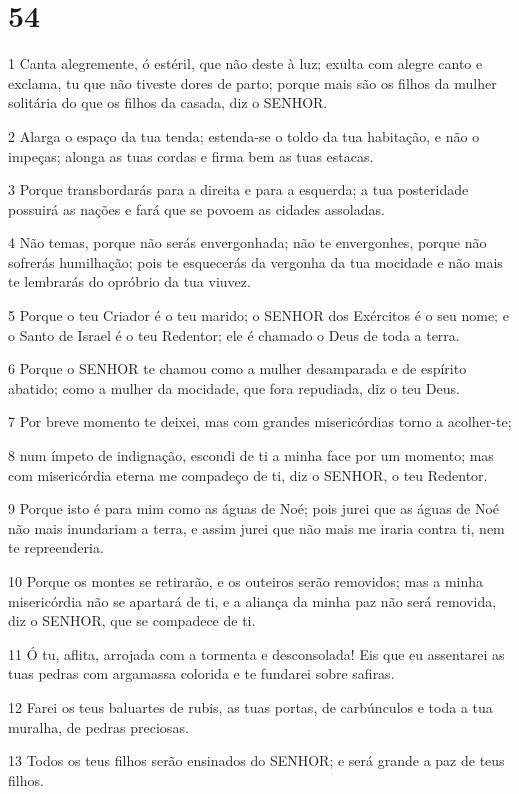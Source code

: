 \chapter{54}

\par 1 Canta alegremente, ó estéril, que não deste à luz; exulta com alegre canto e exclama, tu que não tiveste dores de parto; porque mais são os filhos da mulher solitária do que os filhos da casada, diz o SENHOR.
\par 2 Alarga o espaço da tua tenda; estenda-se o toldo da tua habitação, e não o impeças; alonga as tuas cordas e firma bem as tuas estacas.
\par 3 Porque transbordarás para a direita e para a esquerda; a tua posteridade possuirá as nações e fará que se povoem as cidades assoladas.
\par 4 Não temas, porque não serás envergonhada; não te envergonhes, porque não sofrerás humilhação; pois te esquecerás da vergonha da tua mocidade e não mais te lembrarás do opróbrio da tua viuvez.
\par 5 Porque o teu Criador é o teu marido; o SENHOR dos Exércitos é o seu nome; e o Santo de Israel é o teu Redentor; ele é chamado o Deus de toda a terra.
\par 6 Porque o SENHOR te chamou como a mulher desamparada e de espírito abatido; como a mulher da mocidade, que fora repudiada, diz o teu Deus.
\par 7 Por breve momento te deixei, mas com grandes misericórdias torno a acolher-te;
\par 8 num ímpeto de indignação, escondi de ti a minha face por um momento; mas com misericórdia eterna me compadeço de ti, diz o SENHOR, o teu Redentor.
\par 9 Porque isto é para mim como as águas de Noé; pois jurei que as águas de Noé não mais inundariam a terra, e assim jurei que não mais me iraria contra ti, nem te repreenderia.
\par 10 Porque os montes se retirarão, e os outeiros serão removidos; mas a minha misericórdia não se apartará de ti, e a aliança da minha paz não será removida, diz o SENHOR, que se compadece de ti.
\par 11 Ó tu, aflita, arrojada com a tormenta e desconsolada! Eis que eu assentarei as tuas pedras com argamassa colorida e te fundarei sobre safiras.
\par 12 Farei os teus baluartes de rubis, as tuas portas, de carbúnculos e toda a tua muralha, de pedras preciosas.
\par 13 Todos os teus filhos serão ensinados do SENHOR; e será grande a paz de teus filhos.
